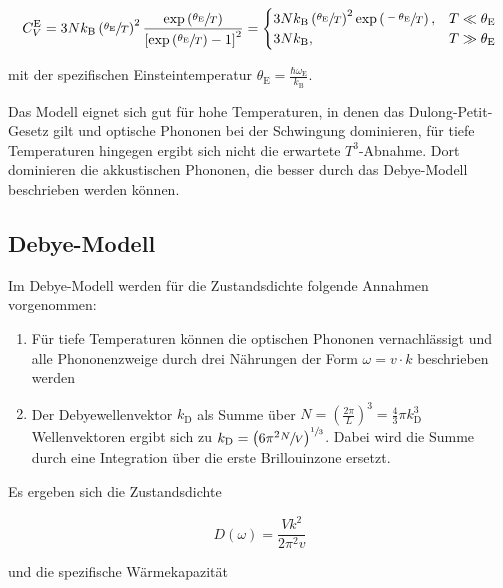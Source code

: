\begin{equation}
    C_V^\text{E} = 3Nk_\text{B} \left(\sfrac{\theta_\text{E}}{T}\right)^2 \frac{\text{exp}\left(\sfrac{\theta_\text{E}}{T}\right)}
    {\left[\text{exp}\left(\sfrac{\theta_\text{E}}{T}\right) - 1\right]^2} = 
    \begin{cases}
        3Nk_\text{B} \left(\sfrac{\theta_\text{E}}{T}\right)^2 \text{exp}\left(\sfrac{-\theta_\text{E}}{T}\right), 
        & T \ll \theta_\text{E} \\
        3Nk_\text{B} , & T \gg \theta_\text{E}
    \end{cases}
\end{equation}

mit der spezifischen Einsteintemperatur $\theta_\text{E} = \frac{\hbar\omega_\text{E}}{k_\text{B}}$.

Das Modell eignet sich gut für hohe Temperaturen, in denen das Dulong-Petit-Gesetz gilt und optische Phononen bei der Schwingung
dominieren, für tiefe Temperaturen hingegen ergibt sich nicht die erwartete $T^3$-Abnahme. Dort dominieren die akkustischen
Phononen, die besser durch das Debye-Modell beschrieben werden können.

\subsection{Debye-Modell}

Im Debye-Modell werden für die Zustandsdichte folgende Annahmen vorgenommen:

\begin{enumerate}
    \item Für tiefe Temperaturen können die optischen Phononen vernachlässigt und alle Phononenzweige durch drei Nährungen der Form $\omega = v \cdot k$ beschrieben werden
    \item Der Debyewellenvektor $k_\text{D}$ als Summe über $N = \left(\frac{2\pi}{L}\right)^3   = \frac{4}{3} \pi k_\text{D}^3$ Wellenvektoren ergibt sich zu $k_\text{D} = \left(6\pi^2\sfrac{N}{V}\right)^{\sfrac{1}{3}}$. Dabei wird die Summe durch eine Integration über die erste Brillouinzone ersetzt.
\end{enumerate}

Es ergeben sich die Zustandsdichte 

\begin{equation}
    D(\omega) = \frac{Vk^2}{2\pi^2v}
\end{equation}

und die spezifische Wärmekapazität

